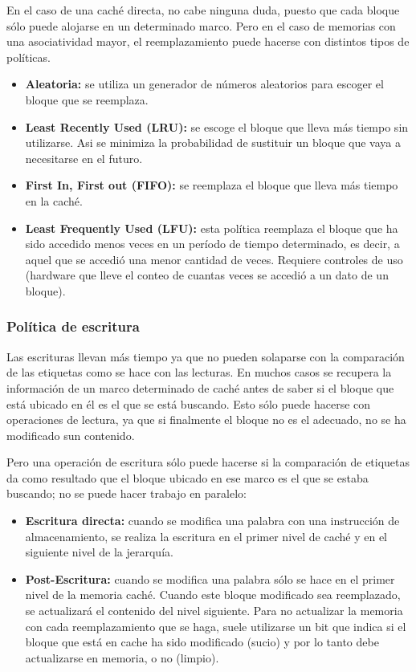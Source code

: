 En el caso de una caché directa, no cabe ninguna duda, puesto que cada bloque sólo puede alojarse en un determinado marco. Pero en el caso de memorias con una asociatividad mayor, el reemplazamiento puede hacerse con distintos tipos de políticas.

\begin{itemize}
  \item \textbf{Aleatoria:} se utiliza un generador de números aleatorios para escoger el bloque que se reemplaza.
  \item \textbf{Least Recently Used (LRU):} se escoge el bloque que lleva más tiempo sin utilizarse. Asi se minimiza la probabilidad de sustituir un bloque que vaya a necesitarse en el futuro.
  \item \textbf{First In, First out (FIFO):} se reemplaza el bloque que lleva más tiempo en la caché.
  \item \textbf{Least Frequently Used (LFU):} esta política reemplaza el bloque que ha sido accedido menos veces en un período de tiempo determinado, es decir, a aquel que se accedió una menor cantidad de veces. Requiere controles de uso (hardware que lleve el conteo de cuantas veces se accedió a un dato de un bloque).
\end{itemize}

\subsubsection*{Política de escritura}

Las escrituras llevan más tiempo ya que no pueden solaparse con la comparación de las etiquetas como se hace con las lecturas. En muchos casos se recupera la información de un marco determinado de caché antes de saber si el bloque que está ubicado en él es el que se está buscando. Esto sólo puede hacerse con operaciones de lectura, ya que si finalmente el bloque no es el adecuado, no se ha modificado sun contenido.

Pero una operación de escritura sólo puede hacerse si la comparación de etiquetas da como resultado que el bloque ubicado en ese marco es el que se estaba buscando; no se puede hacer trabajo en paralelo:

\begin{itemize}
  \item \textbf{Escritura directa:} cuando se modifica una palabra con una instrucción de almacenamiento, se realiza la escritura en el primer nivel de caché y en el siguiente nivel de la jerarquía.
  \item \textbf{Post-Escritura:} cuando se modifica una palabra sólo se hace en el primer nivel de la memoria caché. Cuando este bloque modificado sea reemplazado, se actualizará el contenido del nivel siguiente. Para no actualizar la memoria con cada reemplazamiento que se haga, suele utilizarse un bit que indica si el bloque que está en cache ha sido modificado (sucio) y por lo tanto debe actualizarse en memoria, o no (limpio).
\end{itemize}

